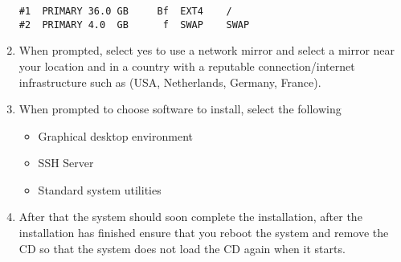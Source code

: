 \begin{enumerate}
\lstset{caption=Manual Partition Layout Example}
\begin{lstlisting}
#1	PRIMARY	36.0 GB		Bf	EXT4	/
#2	PRIMARY	4.0  GB		 f	SWAP	SWAP
\end{lstlisting}

\item When prompted, select yes to use a network mirror and select a mirror near your location and in a country with a reputable 
connection/internet infrastructure such as (USA, Netherlands, Germany, France).

\item When prompted to choose software to install, select the following
\begin{itemize}
\item 	Graphical desktop environment
\item 	SSH Server
\item	Standard system utilities
\end{itemize}

\item After that the system should soon complete the installation, after the installation has finished ensure that you reboot the system and remove
the CD so that the system does not load the CD again when it starts.
\end{enumerate}

